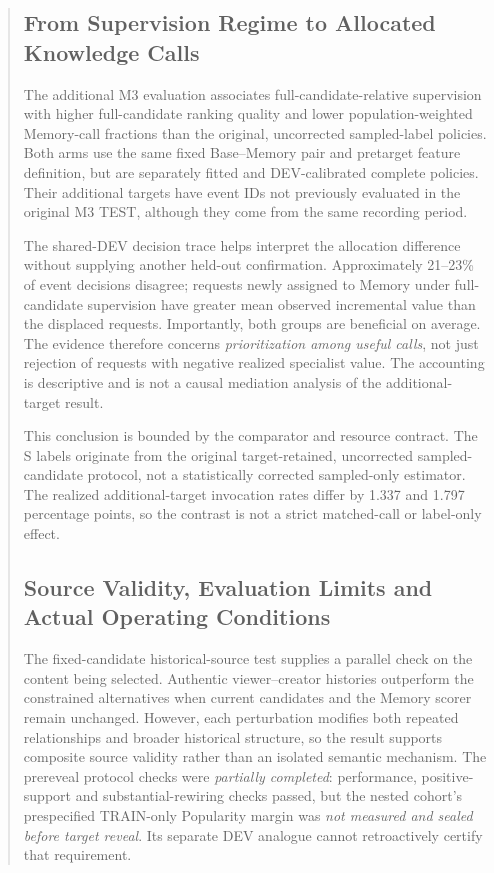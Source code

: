 \begin{abstract}
\subsection{From Supervision Regime to Allocated Knowledge Calls}
\label{sec:discussion-selective-decisions}

The additional M3 evaluation associates full-candidate-relative supervision with higher full-candidate ranking quality and lower population-weighted Memory-call fractions than the original, uncorrected sampled-label policies. Both arms use the same fixed Base--Memory pair and pretarget feature definition, but are separately fitted and DEV-calibrated complete policies. Their additional targets have event IDs not previously evaluated in the original M3 TEST, although they come from the same recording period.

The shared-DEV decision trace helps interpret the allocation difference without supplying another held-out confirmation. Approximately 21--23\% of event decisions disagree; requests newly assigned to Memory under full-candidate supervision have greater mean observed incremental value than the displaced requests. Importantly, both groups are beneficial on average. The evidence therefore concerns \emph{prioritization among useful calls}, not just rejection of requests with negative realized specialist value. The accounting is descriptive and is not a causal mediation analysis of the additional-target result.

This conclusion is bounded by the comparator and resource contract. The S labels originate from the original target-retained, uncorrected sampled-candidate protocol, not a statistically corrected sampled-only estimator. The realized additional-target invocation rates differ by 1.337 and 1.797 percentage points, so the contrast is not a strict matched-call or label-only effect. 

\subsection{Source Validity, Evaluation Limits and Actual Operating Conditions}
\label{sec:discussion-validity}

The fixed-candidate historical-source test supplies a parallel check on the content being selected. Authentic viewer--creator histories outperform the constrained alternatives when current candidates and the Memory scorer remain unchanged. However, each perturbation modifies both repeated relationships and broader historical structure, so the result supports composite source validity rather than an isolated semantic mechanism. The prereveal protocol checks were \emph{partially completed}: performance, positive-support and substantial-rewiring checks passed, but the nested cohort's prespecified TRAIN-only Popularity margin was \emph{not measured and sealed before target reveal}. Its separate DEV analogue cannot retroactively certify that requirement.


\end{abstract}
